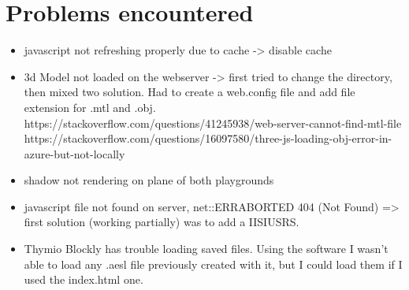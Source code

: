 \documentclass{scrartcl}
\begin{document}
\section{Problems encountered}
\begin{itemize}
  \item javascript not refreshing properly due to cache -> disable cache
  \item 3d Model not loaded on the webserver -> first tried to change the directory, then mixed two solution. 
        Had to create a web.config file and add file extension for .mtl and .obj.
        https://stackoverflow.com/questions/41245938/web-server-cannot-find-mtl-file
        https://stackoverflow.com/questions/16097580/three-js-loading-obj-error-in-azure-but-not-locally
  \item shadow not rendering on plane of both playgrounds
  \item javascript file not found on server, net::ERR\textunderscore ABORTED 404 (Not Found) => first solution (working partially) was to add a IIS\textunderscore IUSRS.
  \item Thymio Blockly has trouble loading saved files. Using the software I wasn't able to load any .aesl file previously created with it, but I could load them if I used the index.html one.
\end{itemize}

\printbibliography[heading=bibintoc]
\end{document}
